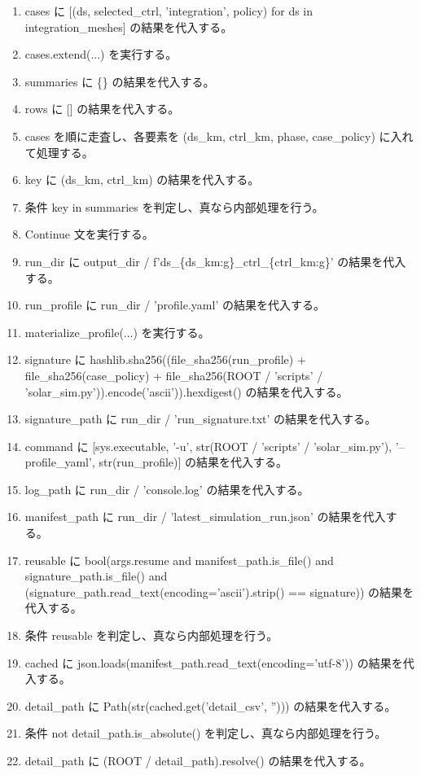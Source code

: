 \documentclass[a4paper,11pt]{article}
\begin{document}
\begin{enumerate}[leftmargin=1.8em]
\item cases に [(ds, selected\_ctrl, 'integration', policy) for ds in integration\_meshes] の結果を代入する。
\item cases.extend(...) を実行する。
\item summaries に \{\} の結果を代入する。
\item rows に [] の結果を代入する。
\item cases を順に走査し、各要素を (ds\_km, ctrl\_km, phase, case\_policy) に入れて処理する。
\item   key に (ds\_km, ctrl\_km) の結果を代入する。
\item   条件 key in summaries を判定し、真なら内部処理を行う。
\item     Continue 文を実行する。
\item   run\_dir に output\_dir / f'ds\_\{ds\_km:g\}\_ctrl\_\{ctrl\_km:g\}' の結果を代入する。
\item   run\_profile に run\_dir / 'profile.yaml' の結果を代入する。
\item   materialize\_profile(...) を実行する。
\item   signature に hashlib.sha256((file\_sha256(run\_profile) + file\_sha256(case\_policy) + file\_sha256(ROOT / 'scripts' / 'solar\_sim.py')).encode('ascii')).hexdigest() の結果を代入する。
\item   signature\_path に run\_dir / 'run\_signature.txt' の結果を代入する。
\item   command に [sys.executable, '-u', str(ROOT / 'scripts' / 'solar\_sim.py'), '--profile\_yaml', str(run\_profile)] の結果を代入する。
\item   log\_path に run\_dir / 'console.log' の結果を代入する。
\item   manifest\_path に run\_dir / 'latest\_simulation\_run.json' の結果を代入する。
\item   reusable に bool(args.resume and manifest\_path.is\_file() and signature\_path.is\_file() and (signature\_path.read\_text(encoding='ascii').strip() == signature)) の結果を代入する。
\item   条件 reusable を判定し、真なら内部処理を行う。
\item     cached に json.loads(manifest\_path.read\_text(encoding='utf-8')) の結果を代入する。
\item     detail\_path に Path(str(cached.get('detail\_csv', ''))) の結果を代入する。
\item     条件 not detail\_path.is\_absolute() を判定し、真なら内部処理を行う。
\item       detail\_path に (ROOT / detail\_path).resolve() の結果を代入する。

\end{enumerate}
\end{document}
